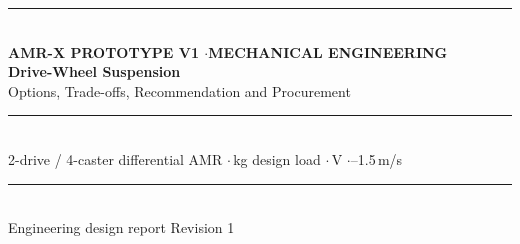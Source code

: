 \documentclass[11pt,a4paper]{article}
\begin{document}
\begin{titlepage}
\thispagestyle{empty}
\vspace*{2.2cm}
\noindent\rule{\linewidth}{1.2pt}\\[10pt]
{\small\bfseries\color{black} AMR-X PROTOTYPE V1 \quad$\cdot$\quad MECHANICAL ENGINEERING}\\[14pt]
{\color{black}\Huge\bfseries Drive-Wheel Suspension}\\[8pt]
{\color{black}\Large Options, Trade-offs, Recommendation and Procurement}\\[12pt]
\noindent\rule{\linewidth}{0.5pt}\\[10pt]
{\normalsize 2-drive / 4-caster differential AMR \quad$\cdot$\,kg design load \quad$\cdot$\,V \quad$\cdot$--1.5\,m/s}
\vfill
\noindent\rule{\linewidth}{0.5pt}\\[4pt]
{\footnotesize Engineering design report \hfill Revision 1}
\end{titlepage}

\end{document}
